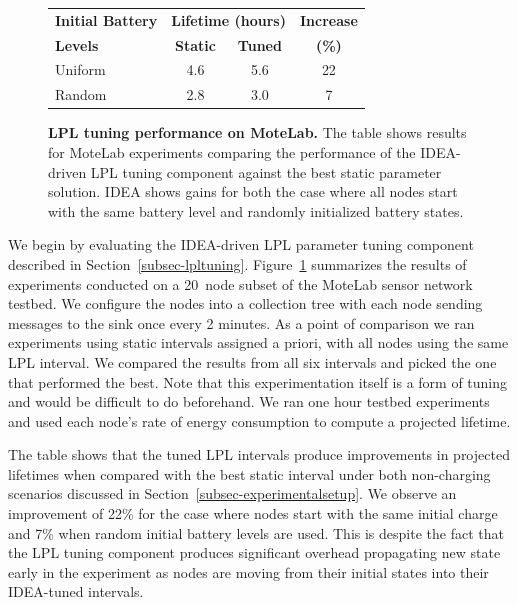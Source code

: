 \begin{figure}[t]
\begin{small}
\begin{center}
\begin{tabular}{|l|ccc|}
\hline
\textbf{Initial Battery} & \multicolumn{2}{c}{\textbf{Lifetime (hours)}} & \textbf{Increase} \\
\textbf{Levels} & \textbf{Static} & \textbf{Tuned} & \textbf{(\%)} \\ \hline
Uniform & 4.6 & 5.6 & 22\\
Random & 2.8 & 3.0 & 7 \\ \hline
\end{tabular}
\end{center}
\end{small}
\caption{\small{\textbf{LPL tuning performance on MoteLab.}
The table shows results for MoteLab experiments comparing the performance of
the IDEA-driven LPL tuning component against the best static parameter
solution. IDEA shows gains for both the case where all nodes start with the
same battery level and randomly initialized battery states.}}
\label{table-lplvoptimalmotelab}
\end{figure}

We begin by evaluating the IDEA-driven LPL parameter tuning component
described in Section~\ref{subsec-lpltuning}.
Figure~\ref{table-lplvoptimalmotelab} summarizes the results of experiments
conducted on a 20~node subset of the MoteLab sensor network testbed. We
configure the nodes into a collection tree with each node sending messages to
the sink once every 2 minutes. As a point of comparison we ran experiments
using static intervals assigned a priori, with all nodes using the same LPL
interval.  We compared the results from all six intervals and picked the one
that performed the best. Note that this experimentation itself is a form of
tuning and would be difficult to do beforehand. We ran one hour testbed
experiments and used each node's rate of energy consumption to compute a
projected lifetime.

The table shows that the tuned LPL intervals produce improvements in
projected lifetimes when compared with the best static interval under both
non-charging scenarios discussed in Section~\ref{subsec-experimentalsetup}.
We observe an improvement of 22\% for the case where nodes start with the
same initial charge and 7\% when random initial battery levels are used. This
is despite the fact that the LPL tuning component produces significant
overhead propagating new state early in the experiment as nodes are moving
from their initial states into their IDEA-tuned intervals.


